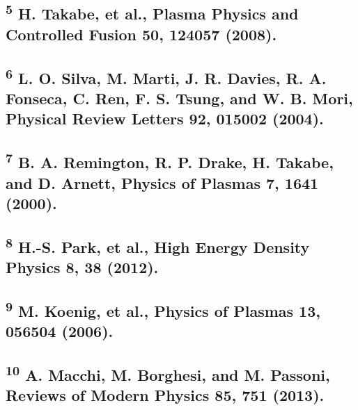 \subsection{\texorpdfstring{\textsuperscript{5} H. Takabe, et al.,
Plasma Physics and Controlled Fusion 50, 124057
(2008).}{5 H. Takabe, et al., Plasma Physics and Controlled Fusion 50, 124057 (2008).}}\label{h.-takabe-et-al.-plasma-physics-and-controlled-fusion-50-124057-2008.}

\subsection{\texorpdfstring{\textsuperscript{6} L. O. Silva, M. Marti,
J. R. Davies, R. A. Fonseca, C. Ren, F. S. Tsung, and W. B. Mori,
Physical Review Letters 92, 015002
(2004).}{6 L. O. Silva, M. Marti, J. R. Davies, R. A. Fonseca, C. Ren, F. S. Tsung, and W. B. Mori, Physical Review Letters 92, 015002 (2004).}}\label{l.-o.-silva-m.-marti-j.-r.-davies-r.-a.-fonseca-c.-ren-f.-s.-tsung-and-w.-b.-mori-physical-review-letters-92-015002-2004.}

\subsection{\texorpdfstring{\textsuperscript{7} B. A. Remington, R. P.
Drake, H. Takabe, and D. Arnett, Physics of Plasmas 7, 1641
(2000).}{7 B. A. Remington, R. P. Drake, H. Takabe, and D. Arnett, Physics of Plasmas 7, 1641 (2000).}}\label{b.-a.-remington-r.-p.-drake-h.-takabe-and-d.-arnett-physics-of-plasmas-7-1641-2000.}

\subsection{\texorpdfstring{\textsuperscript{8} H.-S. Park, et al., High
Energy Density Physics 8, 38
(2012).}{8 H.-S. Park, et al., High Energy Density Physics 8, 38 (2012).}}\label{h.-s.-park-et-al.-high-energy-density-physics-8-38-2012.}

\subsection{\texorpdfstring{\textsuperscript{9} M. Koenig, et al.,
Physics of Plasmas 13, 056504
(2006).}{9 M. Koenig, et al., Physics of Plasmas 13, 056504 (2006).}}\label{m.-koenig-et-al.-physics-of-plasmas-13-056504-2006.}

\subsection{\texorpdfstring{\textsuperscript{10} A. Macchi, M. Borghesi,
and M. Passoni, Reviews of Modern Physics 85, 751
(2013).}{10 A. Macchi, M. Borghesi, and M. Passoni, Reviews of Modern Physics 85, 751 (2013).}}\label{a.-macchi-m.-borghesi-and-m.-passoni-reviews-of-modern-physics-85-751-2013.}

